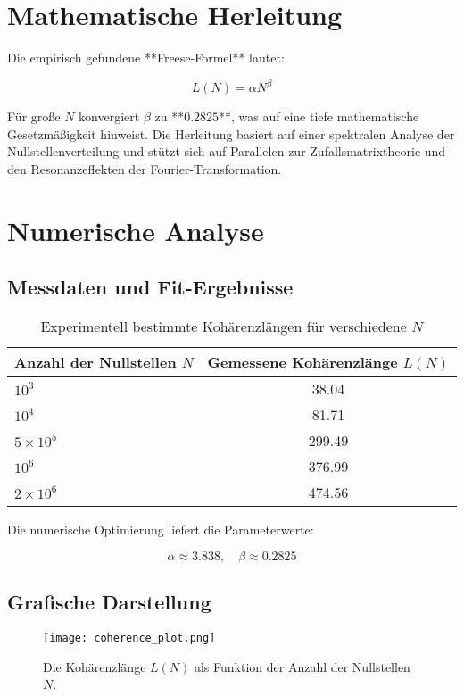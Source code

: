 \documentclass[a4paper,12pt]{article}
\begin{document}
\section{Mathematische Herleitung}

Die empirisch gefundene **Freese-Formel** lautet:

\[
L(N) = \alpha N^\beta
\]

Für große \(N\) konvergiert \(\beta\) zu **\(0.2825\)**, was auf eine tiefe mathematische Gesetzmäßigkeit hinweist.  
Die Herleitung basiert auf einer spektralen Analyse der Nullstellenverteilung und stützt sich auf Parallelen zur Zufallsmatrixtheorie und den Resonanzeffekten der Fourier-Transformation.

\section{Numerische Analyse}

\subsection{Messdaten und Fit-Ergebnisse}

\begin{table}[h]
\centering
\begin{tabular}{l|c}
\toprule
\textbf{Anzahl der Nullstellen \(N\)} & \textbf{Gemessene Kohärenzlänge \(L(N)\)} \\
\midrule
\(10^3\) & 38.04 \\
\(10^4\) & 81.71 \\
\(5 \times 10^5\) & 299.49 \\
\(10^6\) & 376.99 \\
\(2 \times 10^6\) & 474.56 \\
\bottomrule
\end{tabular}
\caption{Experimentell bestimmte Kohärenzlängen für verschiedene \(N\)}
\end{table}

Die numerische Optimierung liefert die Parameterwerte:

\[
\alpha \approx 3.838, \quad \beta \approx 0.2825
\]

\subsection{Grafische Darstellung}

\begin{figure}[h]
\centering
\texttt{[image: coherence\_plot.png]}
\caption{Die Kohärenzlänge \(L(N)\) als Funktion der Anzahl der Nullstellen \(N\).}
\end{figure}
\end{document}
